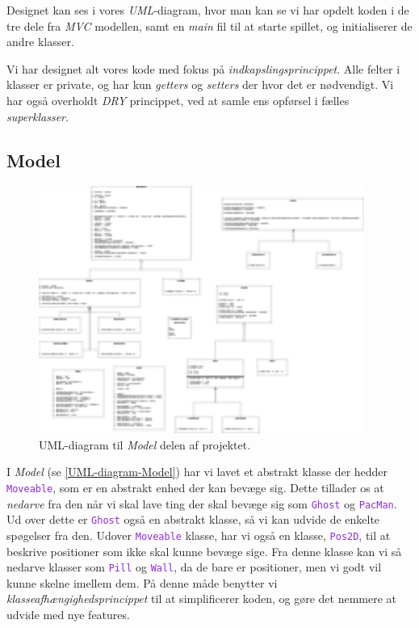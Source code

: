 \documentclass{article}
\newcommand{\class}[1]{\textcolor{BlueViolet}{\small\texttt{#1}}}
\theoremstyle{mytheoremstyle}
\theoremstyle{mytheoremstyle}
\theoremstyle{myproblemstyle}
\begin{document}
Designet kan ses i vores \textit{UML}-diagram, hvor man kan se vi har opdelt
koden i de tre dele fra \textit{MVC} modellen, samt en \textit{main} fil til at
starte spillet, og initialiserer de andre klasser.

Vi har designet alt vores kode med fokus på \textit{indkapslingsprincippet}.
Alle felter i klasser er private, og har kun \textit{getters} og
\textit{setters} der hvor det er nødvendigt. Vi har også overholdt \textit{DRY}
princippet, ved at samle ens opførsel i fælles \textit{superklasser}.


\subsection{Model}\label{sub:Model} %
\begin{figure}[H]
    \begin{center}
        \includegraphics[width=0.95\textwidth]{figures/UML-diagram-model.png}
    \end{center}
    \caption{UML-diagram til \textit{Model} delen af projektet.}
    \label{UML-diagram-Model}
\end{figure}

I \textit{Model} (se \autoref{UML-diagram-Model}) har vi lavet et abstrakt klasse der
hedder \class{Moveable}, som er en abstrakt enhed der kan bevæge sig. Dette
tillader os at \textit{nedarve} fra den når vi skal lave ting der skal bevæge
sig som \class{Ghost} og \class{PacMan}. Ud over dette er \class{Ghost} også en
abstrakt klasse, så vi kan udvide de enkelte spøgelser fra den. Udover
\class{Moveable} klasse, har vi også en klasse, \class{Pos2D}, til at
beskrive positioner som ikke skal kunne bevæge sige. Fra denne klasse kan vi så
nedarve klasser som \class{Pill} og \class{Wall}, da de bare er positioner, men vi
godt vil kunne skelne imellem dem. På denne måde benytter vi
\textit{klasseafhængighedsprincippet} til at simplificerer koden, og gøre det
nemmere at udvide med nye features.
\end{document}
